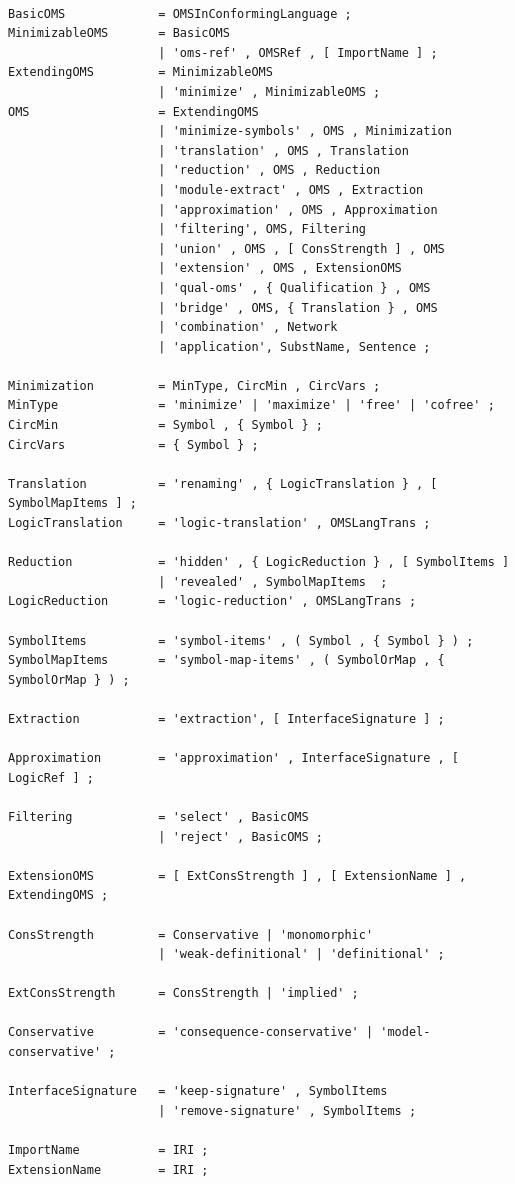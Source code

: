 \documentclass[10pt,%
\ifpretendfinal
final%
\else
draft%
\fi,
]{scrreprt}
\begin{document}
\begin{lstlisting}[language=ebnf,escapeinside={<>}]  % abstract syntax

BasicOMS             = OMSInConformingLanguage ;
MinimizableOMS       = BasicOMS
                     | 'oms-ref' , OMSRef , [ ImportName ] ;
ExtendingOMS         = MinimizableOMS
                     | 'minimize' , MinimizableOMS ;
OMS                  = ExtendingOMS
                     | 'minimize-symbols' , OMS , Minimization
                     | 'translation' , OMS , Translation
                     | 'reduction' , OMS , Reduction
                     | 'module-extract' , OMS , Extraction 
                     | 'approximation' , OMS , Approximation
                     | 'filtering', OMS, Filtering
                     | 'union' , OMS , [ ConsStrength ] , OMS 
                     | 'extension' , OMS , ExtensionOMS
                     | 'qual-oms' , { Qualification } , OMS
                     | 'bridge' , OMS, { Translation } , OMS
                     | 'combination' , Network
                     | 'application', SubstName, Sentence ;

Minimization         = MinType, CircMin , CircVars ;
MinType              = 'minimize' | 'maximize' | 'free' | 'cofree' ;
CircMin              = Symbol , { Symbol } ;
CircVars             = { Symbol } ;

Translation          = 'renaming' , { LogicTranslation } , [ SymbolMapItems ] ;
LogicTranslation     = 'logic-translation' , OMSLangTrans ;

Reduction            = 'hidden' , { LogicReduction } , [ SymbolItems ]
                     | 'revealed' , SymbolMapItems  ;
LogicReduction       = 'logic-reduction' , OMSLangTrans ;

SymbolItems          = 'symbol-items' , ( Symbol , { Symbol } ) ;
SymbolMapItems       = 'symbol-map-items' , ( SymbolOrMap , { SymbolOrMap } ) ;

Extraction           = 'extraction', [ InterfaceSignature ] ;

Approximation        = 'approximation' , InterfaceSignature , [ LogicRef ] ;

Filtering            = 'select' , BasicOMS 
                     | 'reject' , BasicOMS ;

ExtensionOMS         = [ ExtConsStrength ] , [ ExtensionName ] , ExtendingOMS ;

ConsStrength         = Conservative | 'monomorphic'
                     | 'weak-definitional' | 'definitional' ;

ExtConsStrength      = ConsStrength | 'implied' ;

Conservative         = 'consequence-conservative' | 'model-conservative' ;

InterfaceSignature   = 'keep-signature' , SymbolItems 
                     | 'remove-signature' , SymbolItems ;

ImportName           = IRI ;
ExtensionName        = IRI ;
\end{lstlisting}
\end{document}
